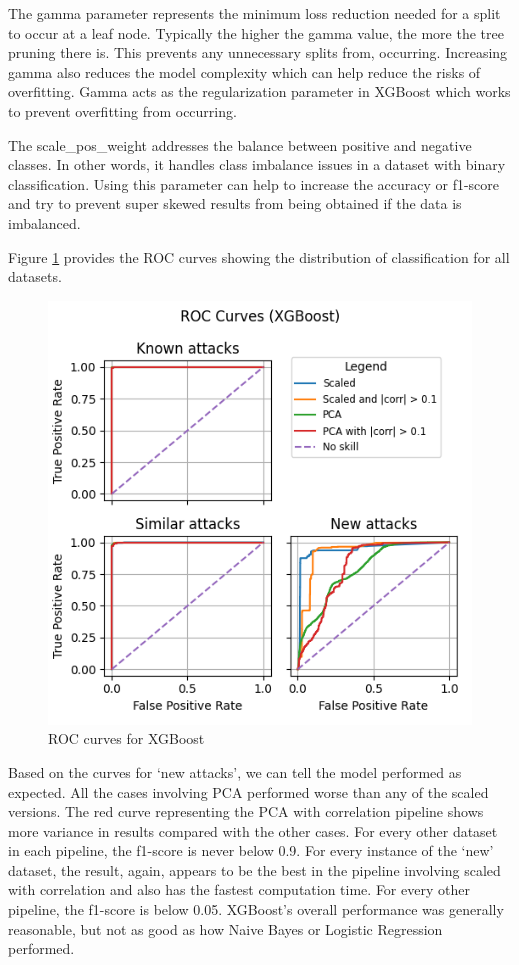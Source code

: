 The gamma parameter represents the minimum loss reduction needed for a split to occur at a leaf node. Typically the higher the gamma value, the more the tree pruning there is. This prevents any unnecessary splits from, occurring. Increasing gamma also reduces the model complexity which can help reduce the risks of overfitting. Gamma acts as the regularization parameter in XGBoost which works to prevent overfitting from occurring. 

The scale\_pos\_weight addresses the balance between positive and negative classes. In other words, it handles class imbalance issues in a dataset with binary classification. Using this parameter can help to increase the accuracy or f1-score and try to prevent super skewed results from being obtained if the data is imbalanced. 

Figure \ref{fig:xgboost_roc} provides the ROC curves showing the distribution of classification for all datasets.
\begin{figure}
    \centering
    \includegraphics[width=\linewidth]{figures/XGBoost_roc_all_small.png}
    \caption{ROC curves for XGBoost}
    \label{fig:xgboost_roc}
\end{figure}

Based on the curves for `new attacks', we can tell the model performed as expected. All the cases involving PCA performed worse than any of the scaled versions. The red curve representing the PCA with correlation pipeline shows more variance in results compared with the other cases. For every other dataset in each pipeline, the f1-score is never below 0.9. For every instance of the `new' dataset, the result, again, appears to be the best in the pipeline involving scaled with correlation and also has the fastest computation time. For every other pipeline, the f1-score is below 0.05. XGBoost's overall performance was generally reasonable, but not as good as how Naive Bayes or Logistic Regression performed. 

